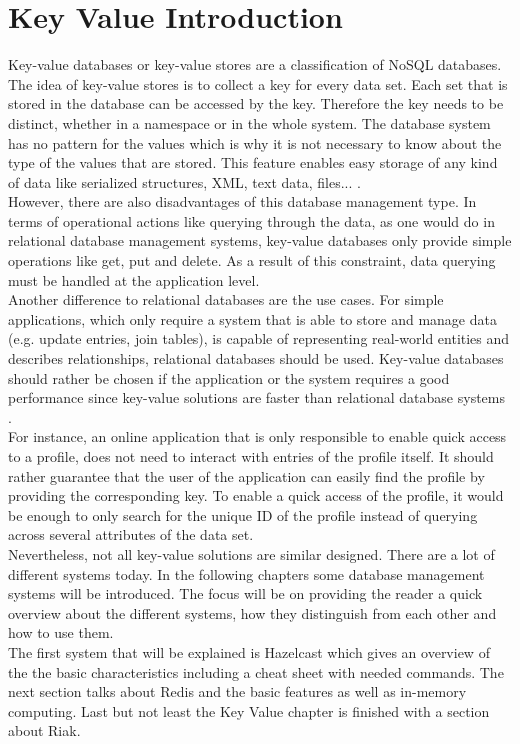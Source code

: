 \chapter{Key Value Introduction}
Key-value databases or key-value stores are a classification of NoSQL databases. 
The idea of key-value stores is to collect a key  for every data set. Each set that is stored in the database can be accessed by the key. Therefore the key needs to be distinct, whether in a namespace or in the whole system. The database system has no pattern for the values which is why it is not  necessary to know about the type of the values that are stored. This feature enables easy storage of any kind of data like serialized structures, XML, text data, files...  \cite{keyValueIntro}. \\
However, there are also disadvantages of this database management type. In terms of operational actions like querying through the data, as one would do in relational database management systems, key-value databases only provide simple operations like get, put and delete. As a result of this constraint, data querying must be handled at the application level. \\
Another difference to relational databases are the use cases. 
 For simple applications, which only require a system that is able to store and manage data (e.g. update entries, join tables), is capable of representing real-world entities and describes relationships, relational databases should be used. Key-value databases should rather be chosen if the application or the system requires a good performance since key-value solutions are faster than relational database systems \cite{keyValueUsecase}. \\
For instance, an online application that is only responsible to enable quick access to a profile, does not need to interact with entries of the profile itself. It should rather guarantee that the user of the application can easily find the profile by providing the corresponding key. To enable a quick access of the profile, it would be enough to only search for the unique ID of the profile instead of querying across several attributes of the data set. \\
Nevertheless, not all key-value solutions are similar designed. There are a lot of different systems today. In the following chapters some database management systems will be introduced. The focus will be on providing the reader a quick overview about the different systems, how they distinguish from each other and how to use them. \\
The first system that will be explained is Hazelcast which gives an overview of the the basic characteristics including a cheat sheet with needed commands. The next section talks about Redis and the basic features as well as in-memory computing. Last but not least the Key Value chapter is finished with a section about Riak. 


